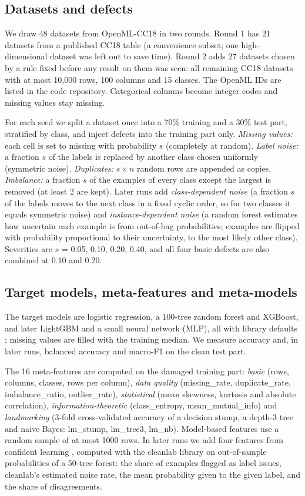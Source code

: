 \documentclass[conference]{IEEEtran}
\begin{document}
\subsection{Datasets and defects}
We draw 48 datasets from OpenML-CC18 \cite{bischl2021openml} in two rounds. Round 1 has 21 datasets from a published CC18 table (a convenience subset; one high-dimensional dataset was left out to save time). Round 2 adds 27 datasets chosen by a rule fixed before any result on them was seen: all remaining CC18 datasets with at most 10{,}000 rows, 100 columns and 15 classes. The OpenML IDs are listed in the code repository. Categorical columns become integer codes and missing values stay missing.

For each seed we split a dataset once into a 70\% training and a 30\% test part, stratified by class, and inject defects into the training part only. \emph{Missing values:} each cell is set to missing with probability $s$ (completely at random). \emph{Label noise:} a fraction $s$ of the labels is replaced by another class chosen uniformly (symmetric noise). \emph{Duplicates:} $s \times n$ random rows are appended as copies. \emph{Imbalance:} a fraction $s$ of the examples of every class except the largest is removed (at least 2 are kept). Later runs add \emph{class-dependent noise} (a fraction $s$ of the labels moves to the next class in a fixed cyclic order, so for two classes it equals symmetric noise) and \emph{instance-dependent noise} (a random forest estimates how uncertain each example is from out-of-bag probabilities; examples are flipped with probability proportional to their uncertainty, to the most likely other class). Severities are $s$ = 0.05, 0.10, 0.20, 0.40, and all four basic defects are also combined at 0.10 and 0.20.

\subsection{Target models, meta-features and meta-models}
The target models are logistic regression, a 100-tree random forest and XGBoost, and later LightGBM and a small neural network (MLP), all with library defaults \cite{chen2016xgboost,pedregosa2011scikit}; missing values are filled with the training median. We measure accuracy and, in later runs, balanced accuracy and macro-F1 on the clean test part.

The 16 meta-features are computed on the damaged training part: \emph{basic} (rows, columns, classes, rows per column), \emph{data quality} (missing\_rate, duplicate\_rate, imbalance\_ratio, outlier\_rate), \emph{statistical} (mean skewness, kurtosis and absolute correlation), \emph{information-theoretic} (class\_entropy, mean\_mutual\_info) and \emph{landmarking} (3-fold cross-validated accuracy of a decision stump, a depth-3 tree and naive Bayes: lm\_stump, lm\_tree3, lm\_nb). Model-based features use a random sample of at most 1000 rows. In later runs we add four features from confident learning \cite{northcutt2021confident}, computed with the cleanlab library on out-of-sample probabilities of a 50-tree forest: the share of examples flagged as label issues, cleanlab's estimated noise rate, the mean probability given to the given label, and the share of disagreements.
\end{document}

